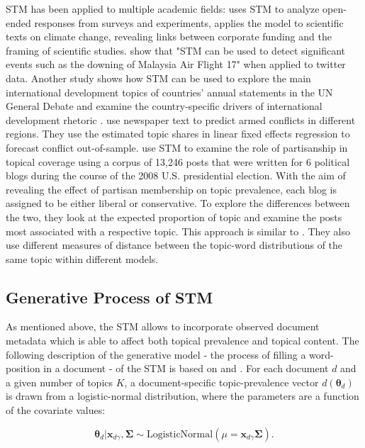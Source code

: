 \documentclass[12pt,a4paper,notitlepage]{article}
\begin{document}
STM has been applied to multiple academic fields: \citet{roberts_structural_2014} uses STM to analyze open-ended responses from surveys and experiments, \citet{farrell_corporate_2016} applies the model to scientific texts on climate change, revealing links between corporate funding and the framing of scientific studies. \citet{mishler_using_2015} show that "STM can be used to detect significant events such as the downing of Malaysia Air Flight 17" when applied to twitter data. Another study shows how STM can be used to explore the main international development topics of countries’ annual statements in the UN General Debate and examine the country-specific drivers of international development rhetoric \citep{baturo_what_2017}. \citet{mueller_reading_2016} use newspaper text to predict armed conflicts in different regions. They use the estimated topic shares in linear fixed effects regression to forecast conflict out-of-sample. \citet{roberts_navigating_2016} use STM to examine the role of partisanship in topical coverage using a corpus of 13,246 posts that were written for 6 political blogs during the course of the 2008 U.S. presidential election. With the aim of revealing the effect of partisan membership on topic prevalence, each blog is assigned to be either liberal or conservative. To explore the differences between the two, they look at the expected proportion of topic and examine the posts most associated with a respective topic. This approach is similar to \citet{roberts_model_2016}. They also use different measures of distance between the topic-word distributions of the same topic within different models.

\subsection{Generative Process of STM}\label{ch_generativeProcess}

As mentioned above, the STM allows to incorporate observed document metadata which is able to affect both topical prevalence and topical content. The following description of the generative model - the process of filling a word-position in a document - of the STM is based on \citet{roberts_structural_2013} and \citet{roberts_stm:_2016}. For each document $d$ and a given number of topics $K$, a document-specific topic-prevalence vector $d(\boldsymbol{\theta}_d)$ is drawn from a logistic-normal distribution, where the parameters are a function of the covariate values:

\begin{equation}
	\boldsymbol{\theta}_d|\boldsymbol{x}_{d\gamma},\boldsymbol{\Sigma} \sim \textrm{LogisticNormal}(\mu = \boldsymbol{x}_{d\gamma}\boldsymbol{\Sigma}).
\end{equation}
\end{document}
